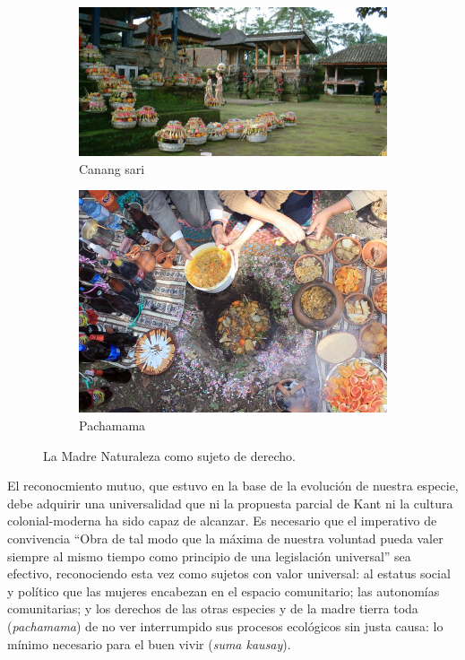 \documentclass[a4paper,10pt]{book}
\theoremstyle{definition}
\begin{document}
\begin{figure}[ht!]
    \centering
    \begin{subfigure}[b]{0.45\textwidth}
    \centering
    \includegraphics[width=\linewidth]{static/bali-offerings}
    \caption{Canang sari}
    \label{}
    \end{subfigure}
    \begin{subfigure}[b]{0.33\textwidth}
    \centering
    \includegraphics[width=\linewidth]{static/pachamama}
    \caption{Pachamama}
    \label{}
    \end{subfigure}
    \caption{La Madre Naturaleza como sujeto de derecho.}
    \label{fig:mito}
\end{figure}

El reconocmiento mutuo, que estuvo en la base de la evolución de nuestra especie, debe adquirir una universalidad que ni la propuesta parcial de Kant ni la cultura colonial-moderna ha sido capaz de alcanzar.
Es necesario que el imperativo de convivencia ``Obra de tal modo que la máxima de nuestra voluntad pueda valer siempre al mismo tiempo como principio de una legislación universal'' sea efectivo, reconociendo esta vez como sujetos con valor universal: al estatus social y político que las mujeres encabezan en el espacio comunitario; las autonomías comunitarias; y los derechos de las otras especies y de la madre tierra toda (\emph{pachamama}) de no ver interrumpido sus procesos ecológicos sin justa causa: lo mínimo necesario para el buen vivir (\emph{suma kausay}).
\end{document}

